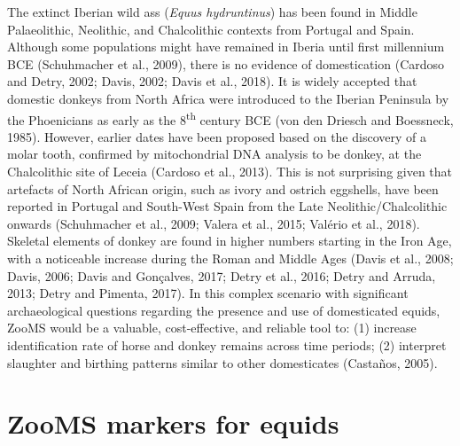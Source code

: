\documentclass[preprint, 3p, authoryear]{elsarticle} %
\begin{document}
The extinct Iberian wild ass (\emph{Equus hydruntinus}) has been found in Middle Palaeolithic, Neolithic, and Chalcolithic contexts from Portugal and Spain. Although some populations might have remained in Iberia until first millennium BCE (Schuhmacher et al., 2009), there is no evidence of domestication (Cardoso and Detry, 2002; Davis, 2002; Davis et al., 2018). It is widely accepted that domestic donkeys from North Africa were introduced to the Iberian Peninsula by the Phoenicians as early as the 8\textsuperscript{th} century BCE (von den Driesch and Boessneck, 1985). However, earlier dates have been proposed based on the discovery of a molar tooth, confirmed by mitochondrial DNA analysis to be donkey, at the Chalcolithic site of Leceia (Cardoso et al., 2013). This is not surprising given that artefacts of North African origin, such as ivory and ostrich eggshells, have been reported in Portugal and South-West Spain from the Late Neolithic/Chalcolithic onwards (Schuhmacher et al., 2009; Valera et al., 2015; Valério et al., 2018). Skeletal elements of donkey are found in higher numbers starting in the Iron Age, with a noticeable increase during the Roman and Middle Ages (Davis et al., 2008; Davis, 2006; Davis and Gonçalves, 2017; Detry et al., 2016; Detry and Arruda, 2013; Detry and Pimenta, 2017). In this complex scenario with significant archaeological questions regarding the presence and use of domesticated equids, ZooMS would be a valuable, cost-effective, and reliable tool to: (1) increase identification rate of horse and donkey remains across time periods; (2) interpret slaughter and birthing patterns similar to other domesticates (Castaños, 2005).

\hypertarget{zooms-markers-for-equids}{%
\section{ZooMS markers for equids}\label{zooms-markers-for-equids}}
\end{document}
